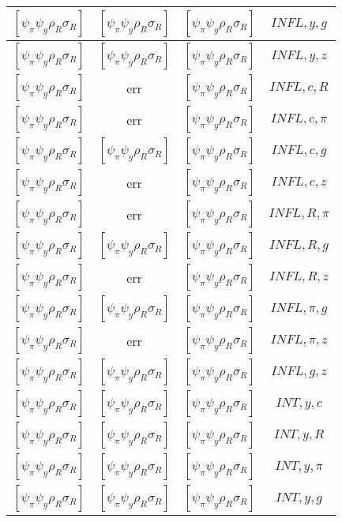 \documentclass[a4paper,10pt]{article}
\begin{document}
\begin{longtable}{|c|c|c|c|}
\hline
$[\psi_\pi \psi_y \rho_R \sigma_R ]$ & $[\psi_\pi \psi_y \rho_R \sigma_R ]$ & $[\psi_\pi \psi_y \rho_R \sigma_R ]$ & ${INFL},{y},{g}$ \\
\hline
$[\psi_\pi \psi_y \rho_R \sigma_R ]$ & $[\psi_\pi \psi_y \rho_R \sigma_R ]$ & $[\psi_\pi \psi_y \rho_R \sigma_R ]$ & ${INFL},{y},{z}$ \\
\hline
$[\psi_\pi \psi_y \rho_R \sigma_R ]$ & err & $[\psi_\pi \psi_y \rho_R \sigma_R ]$ & ${INFL},{c},{R}$ \\
\hline
$[\psi_\pi \psi_y \rho_R \sigma_R ]$ & err & $[\psi_\pi \psi_y \rho_R \sigma_R ]$ & ${INFL},{c},{\pi}$ \\
\hline
$[\psi_\pi \psi_y \rho_R \sigma_R ]$ & $[\psi_\pi \psi_y \rho_R \sigma_R ]$ & $[\psi_\pi \psi_y \rho_R \sigma_R ]$ & ${INFL},{c},{g}$ \\
\hline
$[\psi_\pi \psi_y \rho_R \sigma_R ]$ & err & $[\psi_\pi \psi_y \rho_R \sigma_R ]$ & ${INFL},{c},{z}$ \\
\hline
$[\psi_\pi \psi_y \rho_R \sigma_R ]$ & err & $[\psi_\pi \psi_y \rho_R \sigma_R ]$ & ${INFL},{R},{\pi}$ \\
\hline
$[\psi_\pi \psi_y \rho_R \sigma_R ]$ & $[\psi_\pi \psi_y \rho_R \sigma_R ]$ & $[\psi_\pi \psi_y \rho_R \sigma_R ]$ & ${INFL},{R},{g}$ \\
\hline
$[\psi_\pi \psi_y \rho_R \sigma_R ]$ & err & $[\psi_\pi \psi_y \rho_R \sigma_R ]$ & ${INFL},{R},{z}$ \\
\hline
$[\psi_\pi \psi_y \rho_R \sigma_R ]$ & $[\psi_\pi \psi_y \rho_R \sigma_R ]$ & $[\psi_\pi \psi_y \rho_R \sigma_R ]$ & ${INFL},{\pi},{g}$ \\
\hline
$[\psi_\pi \psi_y \rho_R \sigma_R ]$ & err & $[\psi_\pi \psi_y \rho_R \sigma_R ]$ & ${INFL},{\pi},{z}$ \\
\hline
$[\psi_\pi \psi_y \rho_R \sigma_R ]$ & $[\psi_\pi \psi_y \rho_R \sigma_R ]$ & $[\psi_\pi \psi_y \rho_R \sigma_R ]$ & ${INFL},{g},{z}$ \\
\hline
$[\psi_\pi \psi_y \rho_R \sigma_R ]$ & $[\psi_\pi \psi_y \rho_R \sigma_R ]$ & $[\psi_\pi \psi_y \rho_R \sigma_R ]$ & ${INT},{y},{c}$ \\
\hline
$[\psi_\pi \psi_y \rho_R \sigma_R ]$ & $[\psi_\pi \psi_y \rho_R \sigma_R ]$ & $[\psi_\pi \psi_y \rho_R \sigma_R ]$ & ${INT},{y},{R}$ \\
\hline
$[\psi_\pi \psi_y \rho_R \sigma_R ]$ & $[\psi_\pi \psi_y \rho_R \sigma_R ]$ & $[\psi_\pi \psi_y \rho_R \sigma_R ]$ & ${INT},{y},{\pi}$ \\
\hline
$[\psi_\pi \psi_y \rho_R \sigma_R ]$ & $[\psi_\pi \psi_y \rho_R \sigma_R ]$ & $[\psi_\pi \psi_y \rho_R \sigma_R ]$ & ${INT},{y},{g}$ \\

\end{longtable}
\end{document}
